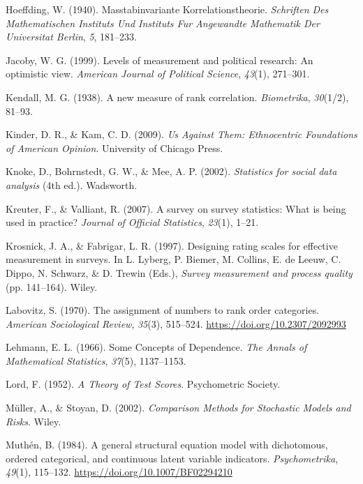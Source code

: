 \documentclass[
  12pt,
]{article}
\newlength{\cslhangindent}
\newenvironment{CSLReferences}[2] %
 {\begin{list}{}{%
  \setlength{\itemindent}{0pt}
  \setlength{\leftmargin}{0pt}
  \setlength{\parsep}{0pt}
  \ifodd #1
   \setlength{\leftmargin}{\cslhangindent}
   \setlength{\itemindent}{-1\cslhangindent}
  \fi
  \setlength{\itemsep}{#2\baselineskip}}}
 {\end{list}}
\theoremstyle{plain}
\theoremstyle{definition}
\theoremstyle{remark}
\begin{document}
\begin{CSLReferences}{1}{0}
Hoeffding, W. (1940). Masstabinvariante {Korrelationstheorie}.
\emph{Schriften Des Mathematischen Instituts Und Instituts Fur
Angewandte Mathematik Der Universitat Berlin}, \emph{5}, 181--233.

Jacoby, W. G. (1999). Levels of measurement and political research: {An}
optimistic view. \emph{American Journal of Political Science},
\emph{43}(1), 271--301.

Kendall, M. G. (1938). A new measure of rank correlation.
\emph{Biometrika}, \emph{30}(1/2), 81--93.

Kinder, D. R., \& Kam, C. D. (2009). \emph{Us {Against Them}:
{Ethnocentric Foundations} of {American Opinion}}. University of Chicago
Press.

Knoke, D., Bohrnstedt, G. W., \& Mee, A. P. (2002). \emph{Statistics for
social data analysis} (4th ed.). Wadsworth.

Kreuter, F., \& Valliant, R. (2007). A survey on survey statistics:
{What} is being used in practice? \emph{Journal of Official Statistics},
\emph{23}(1), 1--21.

Krosnick, J. A., \& Fabrigar, L. R. (1997). Designing rating scales for
effective measurement in surveys. In L. Lyberg, P. Biemer, M. Collins,
E. de Leeuw, C. Dippo, N. Schwarz, \& D. Trewin (Eds.), \emph{Survey
measurement and process quality} (pp. 141--164). Wiley.

Labovitz, S. (1970). The assignment of numbers to rank order categories.
\emph{American Sociological Review}, \emph{35}(3), 515--524.
\url{https://doi.org/10.2307/2092993}

Lehmann, E. L. (1966). Some {Concepts} of {Dependence}. \emph{The Annals
of Mathematical Statistics}, \emph{37}(5), 1137--1153.

Lord, F. (1952). \emph{A {Theory} of {Test Scores}}. Psychometric
Society.

Müller, A., \& Stoyan, D. (2002). \emph{Comparison {Methods} for
{Stochastic Models} and {Risks}}. Wiley.

Muthén, B. (1984). A general structural equation model with dichotomous,
ordered categorical, and continuous latent variable indicators.
\emph{Psychometrika}, \emph{49}(1), 115--132.
\url{https://doi.org/10.1007/BF02294210}


\end{CSLReferences}
\end{document}
